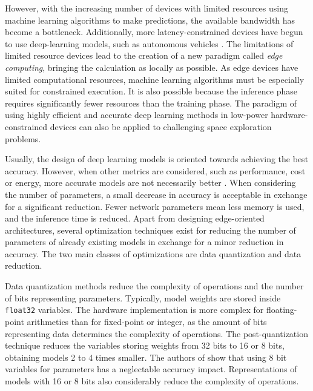 \documentclass[a4paper,twoside,12pt]{book}
\begin{document}
However, with the increasing number of devices with limited resources using machine learning algorithms to make predictions, the available bandwidth has become a bottleneck. Additionally, more latency-constrained devices have begun to use deep-learning models, such as autonomous vehicles \cite{grigorescu2020survey}. The limitations of limited resource devices lead to the creation of a new paradigm called \emph{edge computing}, bringing the calculation as locally as possible. As edge devices have limited computational resources, machine learning algorithms must be especially suited for constrained execution. It is also possible because the inference phase requires significantly fewer resources than the training phase. The paradigm of using highly efficient and accurate deep learning methods in low-power hardware-constrained devices can also be applied to challenging space exploration problems. %

Usually, the design of deep learning models is oriented towards achieving the best accuracy. However, when other metrics are considered, such as performance, cost or energy, more accurate models are not necessarily better \cite{vestias2020moving}. When considering the number of parameters, a small decrease in accuracy is acceptable in exchange for a significant reduction. Fewer network parameters mean less memory is used, and the inference time is reduced. Apart from designing edge-oriented architectures, several optimization techniques exist for reducing the number of parameters of already existing models in exchange for a minor reduction in accuracy. The two main classes of optimizations are data quantization and data reduction.

Data quantization methods reduce the complexity of operations and the number of bits representing parameters. Typically, model weights are stored inside \texttt{float32} variables. The hardware implementation is more complex for floating-point arithmetics than for fixed-point or integer, as the amount of bits representing data determines the complexity of operations. The post-quantization technique reduces the variables storing weights from 32 bits to 16 or 8 bits, obtaining models 2 to 4 times smaller. The authors of \cite{gysel2016hardware} show that using 8 bit variables for parameters has a neglectable accuracy impact. Representations of models with 16 or 8 bits also considerably reduce the complexity of operations.
\end{document}

